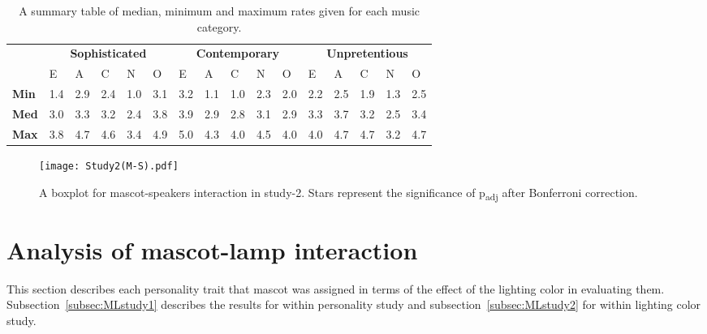 \begin{table}[!htb]
    \renewcommand{\arraystretch}{1}
    \begin{center}
        \begin{tabular}{p{}|
        p{}|p{}|p{}|p{}|p{}||
        p{}|p{}|p{}|p{}|p{}||
        p{}|p{}|p{}|p{}|p{}|}
            \cline{2-16}
            & \multicolumn{5}{c||}{\textbf{Sophisticated}} & \multicolumn{5}{c||}{\textbf{Contemporary}}
            & \multicolumn{5}{c|}{\textbf{Unpretentious}} \\
            \cline{2-16}
            & E & A & C & N & O & E & A & C & N & O & E & A & C & N & O     \\
            \cline{2-16}
            \textbf{Min}    & 1.4 & 2.9 & 2.4 & 1.0 & 3.1 & 3.2 & 1.1 & 1.0 & 2.3 & 2.0 & 2.2 & 2.5 & 1.9 & 1.3 & 2.5  \\
            \textbf{Med}    & 3.0 & 3.3 & 3.2 & 2.4 & 3.8 & 3.9 & 2.9 & 2.8 & 3.1 & 2.9 & 3.3 & 3.7 & 3.2 & 2.5 & 3.4   \\
            \textbf{Max}    & 3.8 & 4.7 & 4.6 & 3.4 & 4.9 & 5.0 & 4.3 & 4.0 & 4.5 & 4.0 & 4.0 & 4.7 & 4.7 & 3.2 & 4.7 \\
            \cline{2-16}
        \end{tabular}
        \caption[]{A summary table of median, minimum and maximum rates given for each music category.\footnotemark}
        \label{table:medianMS2}
    \end{center}
\end{table}
\begin{figure}[!htb]
    \centering
    \texttt{[image: Study2(M-S).pdf]}
    \caption[]{A boxplot for mascot-speakers interaction in study-2.
    Stars represent the significance of p\textsubscript{adj} after Bonferroni correction.\footnotemark}
    \label{fig:MS2}
\end{figure}
\section{Analysis of mascot-lamp interaction}
\label{sec:m-l}
This section describes each personality trait that mascot was assigned in terms of
the effect of the lighting color in evaluating them.
Subsection~\ref{subsec:MLstudy1} describes the results for within personality study and
subsection~\ref{subsec:MLstudy2} for within lighting color study.

